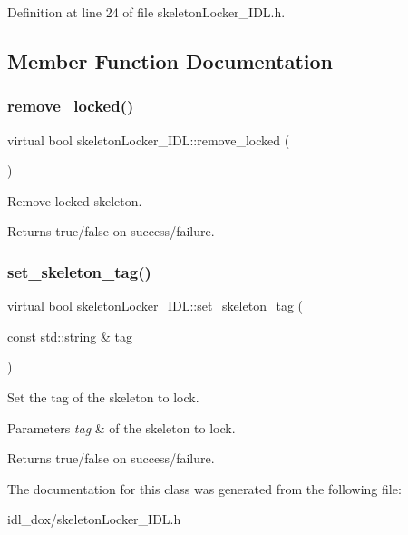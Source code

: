 Definition at line 24 of file skeleton\+Locker\+\_\+\+I\+D\+L.\+h.



\subsection{Member Function Documentation}
\mbox{\label{classskeletonLocker__IDL_a04c6d47ceeba5f4caac0695d173661f5}} 
\subsubsection{\texorpdfstring{remove\+\_\+locked()}{remove\_locked()}}
{\footnotesize\ttfamily virtual bool skeleton\+Locker\+\_\+\+I\+D\+L\+::remove\+\_\+locked (\begin{DoxyParamCaption}{ }\end{DoxyParamCaption})\hspace{0.3cm}{\ttfamily [virtual]}}



Remove locked skeleton. 

\begin{DoxyReturn}{Returns}
true/false on success/failure. 
\end{DoxyReturn}
\mbox{\label{classskeletonLocker__IDL_aae7859cb991b4c0202529731a92ec088}} 
\subsubsection{\texorpdfstring{set\+\_\+skeleton\+\_\+tag()}{set\_skeleton\_tag()}}
{\footnotesize\ttfamily virtual bool skeleton\+Locker\+\_\+\+I\+D\+L\+::set\+\_\+skeleton\+\_\+tag (\begin{DoxyParamCaption}\item[{const std\+::string \&}]{tag }\end{DoxyParamCaption})\hspace{0.3cm}{\ttfamily [virtual]}}



Set the tag of the skeleton to lock. 


\begin{DoxyParams}{Parameters}
{\em tag} & of the skeleton to lock. \\
\hline
\end{DoxyParams}
\begin{DoxyReturn}{Returns}
true/false on success/failure. 
\end{DoxyReturn}


The documentation for this class was generated from the following file\+:\begin{DoxyCompactItemize}
\item 
idl\+\_\+dox/skeleton\+Locker\+\_\+\+I\+D\+L.\+h\end{DoxyCompactItemize}

